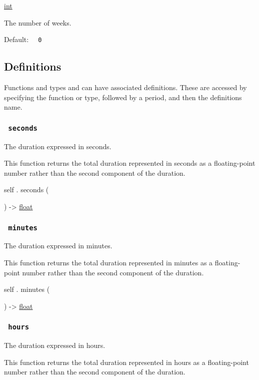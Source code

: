 \href{/docs/reference/foundations/int/}{int}

The number of weeks.

Default: \texttt{\ }{\texttt{\ 0\ }}\texttt{\ }

\subsection{\texorpdfstring{{ Definitions
}}{ Definitions }}\label{definitions}

\label{definitions-tooltip}
Functions and types and can have associated definitions. These are
accessed by specifying the function or type, followed by a period, and
then the definition\textquotesingle s name.

\subsubsection{\texorpdfstring{\texttt{\ seconds\ }}{ seconds }}\label{definitions-seconds}

The duration expressed in seconds.

This function returns the total duration represented in seconds as a
floating-point number rather than the second component of the duration.

self { . } { seconds } (

) -\textgreater{} \href{/docs/reference/foundations/float/}{float}

\subsubsection{\texorpdfstring{\texttt{\ minutes\ }}{ minutes }}\label{definitions-minutes}

The duration expressed in minutes.

This function returns the total duration represented in minutes as a
floating-point number rather than the second component of the duration.

self { . } { minutes } (

) -\textgreater{} \href{/docs/reference/foundations/float/}{float}

\subsubsection{\texorpdfstring{\texttt{\ hours\ }}{ hours }}\label{definitions-hours}

The duration expressed in hours.

This function returns the total duration represented in hours as a
floating-point number rather than the second component of the duration.

